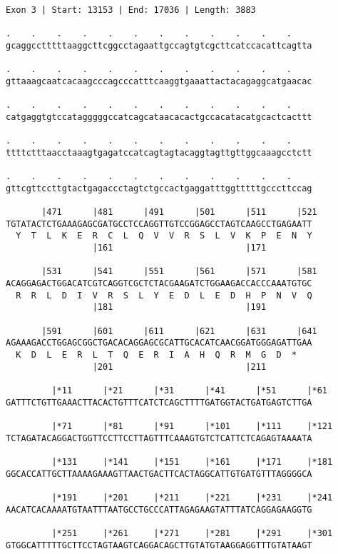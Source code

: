 \documentclass{article}
\begin{document}
\begin{Verbatim}
Exon 3 | Start: 13153 | End: 17036 | Length: 3883
 
.    .    .    .    .    .    .    .    .    .    .    .    
gcaggcctttttaaggcttcggcctagaattgccagtgtcgcttcatccacattcagtta
  
.    .    .    .    .    .    .    .    .    .    .    .    
gttaaagcaatcacaagcccagcccatttcaaggtgaaattactacagaggcatgaacac
  
.    .    .    .    .    .    .    .    .    .    .    .    
catgaggtgtccatagggggccatcagcataacacactgccacatacatgcactcacttt
  
.    .    .    .    .    .    .    .    .    .    .    .    
ttttctttaacctaaagtgagatccatcagtagtacaggtagttgttggcaaagcctctt
  
.    .    .    .    .    .    .    .    .    .    .    .    
gttcgttccttgtactgagaccctagtctgccactgaggatttggtttttgcccttccag
  
       |471      |481      |491      |501      |511      |521
TGTATACTCTGAAAGAGCGATGCCTCCAGGTTGTCCGGAGCCTAGTCAAGCCTGAGAATT
  Y  T  L  K  E  R  C  L  Q  V  V  R  S  L  V  K  P  E  N  Y
                 |161                          |171         
  
       |531      |541      |551      |561      |571      |581
ACAGGAGACTGGACATCGTCAGGTCGCTCTACGAAGATCTGGAAGACCACCCAAATGTGC
  R  R  L  D  I  V  R  S  L  Y  E  D  L  E  D  H  P  N  V  Q
                 |181                          |191         
  
       |591      |601      |611      |621      |631      |641
AGAAAGACCTGGAGCGGCTGACACAGGAGCGCATTGCACATCAACGGATGGGAGATTGAA
  K  D  L  E  R  L  T  Q  E  R  I  A  H  Q  R  M  G  D  *   
                 |201                          |211         
  
         |*11      |*21      |*31      |*41      |*51      |*61
GATTTCTGTTGAAACTTACACTGTTTCATCTCAGCTTTTGATGGTACTGATGAGTCTTGA
  
         |*71      |*81      |*91      |*101     |*111     |*121
TCTAGATACAGGACTGGTTCCTTCCTTAGTTTCAAAGTGTCTCATTCTCAGAGTAAAATA
  
         |*131     |*141     |*151     |*161     |*171     |*181
GGCACCATTGCTTAAAAGAAAGTTAACTGACTTCACTAGGCATTGTGATGTTTAGGGGCA
  
         |*191     |*201     |*211     |*221     |*231     |*241
AACATCACAAAATGTAATTTAATGCCTGCCCATTAGAGAAGTATTTATCAGGAGAAGGTG
  
         |*251     |*261     |*271     |*281     |*291     |*301
GTGGCATTTTTGCTTCCTAGTAAGTCAGGACAGCTTGTATGTAAGGAGGTTTGTATAAGT
  

\end{Verbatim}
\end{document}
